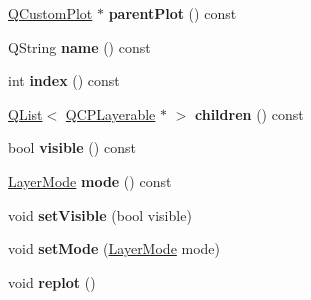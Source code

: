 \begin{DoxyCompactItemize}
\item 
\hyperlink{class_q_custom_plot}{Q\+Custom\+Plot} $\ast$ {\bfseries parent\+Plot} () const \hypertarget{class_q_c_p_layer_a3958c9a938c2d05a7378c41484acee08}{}\label{class_q_c_p_layer_a3958c9a938c2d05a7378c41484acee08}

\item 
Q\+String {\bfseries name} () const \hypertarget{class_q_c_p_layer_a96ebd1e436f3813938cb9cd4a59a60be}{}\label{class_q_c_p_layer_a96ebd1e436f3813938cb9cd4a59a60be}

\item 
int {\bfseries index} () const \hypertarget{class_q_c_p_layer_ad5d7010829a6b99f326b07d7e37c8c99}{}\label{class_q_c_p_layer_ad5d7010829a6b99f326b07d7e37c8c99}

\item 
\hyperlink{class_q_list}{Q\+List}$<$ \hyperlink{class_q_c_p_layerable}{Q\+C\+P\+Layerable} $\ast$ $>$ {\bfseries children} () const \hypertarget{class_q_c_p_layer_a402c2990a74313ce06f386abb673638f}{}\label{class_q_c_p_layer_a402c2990a74313ce06f386abb673638f}

\item 
bool {\bfseries visible} () const \hypertarget{class_q_c_p_layer_a9efca636e4dcad721999a6282f296016}{}\label{class_q_c_p_layer_a9efca636e4dcad721999a6282f296016}

\item 
\hyperlink{class_q_c_p_layer_a67dcfc1590be2a1f2227c5a39bb59c7c}{Layer\+Mode} {\bfseries mode} () const \hypertarget{class_q_c_p_layer_ae93755983003f89e5331bc91598a772e}{}\label{class_q_c_p_layer_ae93755983003f89e5331bc91598a772e}

\item 
void {\bfseries set\+Visible} (bool visible)\hypertarget{class_q_c_p_layer_ac07671f74edf6884b51a82afb2c19516}{}\label{class_q_c_p_layer_ac07671f74edf6884b51a82afb2c19516}

\item 
void {\bfseries set\+Mode} (\hyperlink{class_q_c_p_layer_a67dcfc1590be2a1f2227c5a39bb59c7c}{Layer\+Mode} mode)\hypertarget{class_q_c_p_layer_a938d57b04f4e4c23cedf1711f983919b}{}\label{class_q_c_p_layer_a938d57b04f4e4c23cedf1711f983919b}

\item 
void {\bfseries replot} ()\hypertarget{class_q_c_p_layer_adefd53b6db02f470151c416f42e37180}{}\label{class_q_c_p_layer_adefd53b6db02f470151c416f42e37180}

\end{DoxyCompactItemize}

